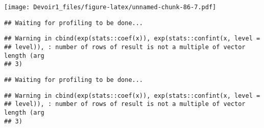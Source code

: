 \documentclass[]{article}
\newenvironment{Shaded}{\begin{snugshade}}{\end{snugshade}}
\newcommand{\KeywordTok}[1]{\textcolor[rgb]{0.13,0.29,0.53}{\textbf{#1}}}
\newcommand{\DataTypeTok}[1]{\textcolor[rgb]{0.13,0.29,0.53}{#1}}
\newcommand{\DecValTok}[1]{\textcolor[rgb]{0.00,0.00,0.81}{#1}}
\newcommand{\StringTok}[1]{\textcolor[rgb]{0.31,0.60,0.02}{#1}}
\newcommand{\OperatorTok}[1]{\textcolor[rgb]{0.81,0.36,0.00}{\textbf{#1}}}
\newcommand{\NormalTok}[1]{#1}
\begin{document}
\texttt{[image: Devoir1\_files/figure-latex/unnamed-chunk-86-7.pdf]}

\begin{Shaded}
\end{Shaded}

\begin{verbatim}
## Waiting for profiling to be done...
\end{verbatim}

\begin{verbatim}
## Warning in cbind(exp(stats::coef(x)), exp(stats::confint(x, level =
## level)), : number of rows of result is not a multiple of vector length (arg
## 3)
\end{verbatim}

\begin{verbatim}
## Waiting for profiling to be done...
\end{verbatim}

\begin{verbatim}
## Warning in cbind(exp(stats::coef(x)), exp(stats::confint(x, level =
## level)), : number of rows of result is not a multiple of vector length (arg
## 3)
\end{verbatim}
\end{document}
